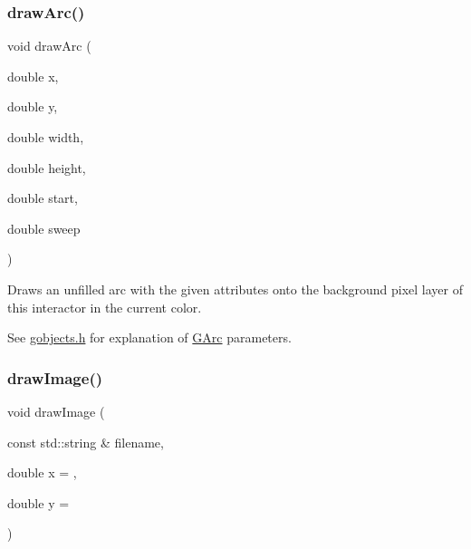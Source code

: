 \mbox{\label{classsgl_1_1GDrawingSurface_a38b6fae1045191c57092b49905068144}} 
\subsubsection{\texorpdfstring{draw\+Arc()}{drawArc()}}
{\footnotesize\ttfamily void draw\+Arc (\begin{DoxyParamCaption}\item[{double}]{x,  }\item[{double}]{y,  }\item[{double}]{width,  }\item[{double}]{height,  }\item[{double}]{start,  }\item[{double}]{sweep }\end{DoxyParamCaption})\hspace{0.3cm}{\ttfamily [virtual]}}



Draws an unfilled arc with the given attributes onto the background pixel layer of this interactor in the current color. 

See \mbox{\hyperlink{gobjects_8h_source}{gobjects.\+h}} for explanation of \mbox{\hyperlink{classsgl_1_1GArc}{G\+Arc}} parameters. \mbox{\label{classsgl_1_1GDrawingSurface_abdd4cb1f2c64adc5d03522a1ee30febf}} 
\subsubsection{\texorpdfstring{draw\+Image()}{drawImage()}}
{\footnotesize\ttfamily void draw\+Image (\begin{DoxyParamCaption}\item[{const std\+::string \&}]{filename,  }\item[{double}]{x = {},  }\item[{double}]{y = {} }\end{DoxyParamCaption})\hspace{0.3cm}{\ttfamily [virtual]}}



